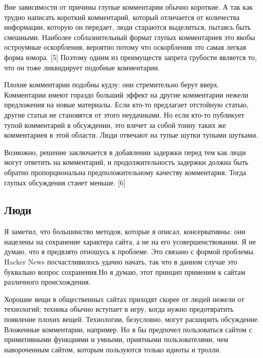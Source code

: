 \documentclass[ebook,12pt,oneside,openany]{memoir}
\begin{document}
Вне зависимости от причины глупые комментарии обычно короткие. А так
как трудно написать короткий комментарий, который отличается от
количества информации, которую он передает, люди стараются выделиться,
пытаясь быть смешными. Наиболее соблазнительный формат глупых
комментариев это якобы остроумные оскорбления, вероятно потому что
оскорбления это самая легкая форма юмора. [5] Поэтому одним из
преимуществ запрета грубости является то, что он тоже ликвидирует
подобные комментарии. \newline

Плохие комментарии подобны кудзу: они стремительно берут вверх.
Комментарии имеют гораздо больший эффект на другие комментарии нежели
предложения на новые материалы. Если кто-то предлагает отстойную
статью, другие статьи не становятся от этого неудачными. Но если
кто-то публикует тупой комментарий в обсуждении, это влечет за собой
тонну таких же комментариев в этой области. Люди отвечают на тупые
шутки тупыми шутками. \newline

Возможно, решение заключается в добавлении задержки перед тем как люди
могут ответить на комментарий, и продолжительность задержки должна
быть обратно пропорциональна предположительному качеству комментария.
Тогда глупых обсуждения станет меньше. [6] \newline

\subsection{Люди}

Я заметил, что большинство методов, которые я описал, консервативны:
они нацелены на сохранение характера сайта, а не на его
усовершенствовании. Я не думаю, что я предвзято отношусь к проблеме.
Это связано с формой проблемы. Hacker News посчастливилось удачно
начать, так что в данном случае это буквально вопрос сохранения.Но я
думаю, этот принцип применим к сайтам различного происхождения. \newline

Хорошие вещи в общественных сайтах приходят скорее от людей нежели от
технологий; техника обычно вступает в игру, когда нужно предотвратить
появление плохих вещей. Технологии, безусловно, могут расширить
обсуждение. Вложенные комментарии, например. Но я бы предпочел
пользоваться сайтом с примитивными функциями и умными, приятными
пользователями, чем навороченным сайтом, которым пользуются только
идиоты и тролли. \newline
\end{document}
